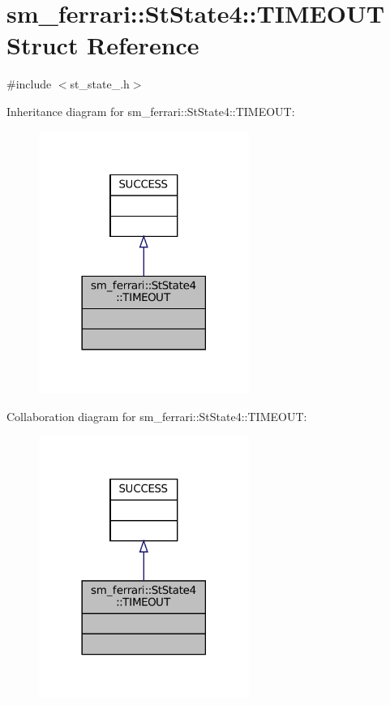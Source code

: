 \hypertarget{structsm__ferrari_1_1StState4_1_1TIMEOUT}{}\section{sm\+\_\+ferrari\+:\+:St\+State4\+:\+:T\+I\+M\+E\+O\+UT Struct Reference}
\label{structsm__ferrari_1_1StState4_1_1TIMEOUT}


{\ttfamily \#include $<$st\+\_\+state\+\_.\+h$>$}



Inheritance diagram for sm\+\_\+ferrari\+:\+:St\+State4\+:\+:T\+I\+M\+E\+O\+UT\+:
\nopagebreak
\begin{figure}[H]
\begin{center}
\leavevmode
\includegraphics[width=194pt]{structsm__ferrari_1_1StState4_1_1TIMEOUT__inherit__graph}
\end{center}
\end{figure}


Collaboration diagram for sm\+\_\+ferrari\+:\+:St\+State4\+:\+:T\+I\+M\+E\+O\+UT\+:
\nopagebreak
\begin{figure}[H]
\begin{center}
\leavevmode
\includegraphics[width=194pt]{structsm__ferrari_1_1StState4_1_1TIMEOUT__coll__graph}
\end{center}
\end{figure}


